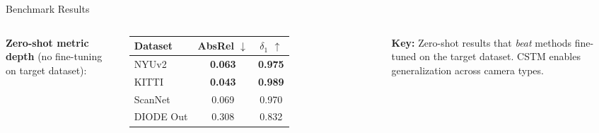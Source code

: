 \begin{frame}{Benchmark Results}
\begin{columns}[T]
\textbf{Zero-shot metric depth} (no fine-tuning on target dataset):

\vspace{0.2cm}
\begin{tabular}{lcc}
  \toprule
  \textbf{Dataset} & \textbf{AbsRel $\downarrow$} & \textbf{$\delta_1$ $\uparrow$} \\
  \midrule
  NYUv2 & \textcolor{garnet}{\textbf{0.063}} & \textcolor{garnet}{\textbf{0.975}} \\
  KITTI & \textcolor{garnet}{\textbf{0.043}} & \textcolor{garnet}{\textbf{0.989}} \\
  ScanNet & 0.069 & 0.970 \\
  DIODE Out & 0.308 & 0.832 \\
  \bottomrule
\end{tabular}

\vspace{0.3cm}
\textbf{Key:} Zero-shot results that \textit{beat} methods fine-tuned on the target dataset. CSTM enables generalization across camera types.

\end{columns}
\end{frame}
